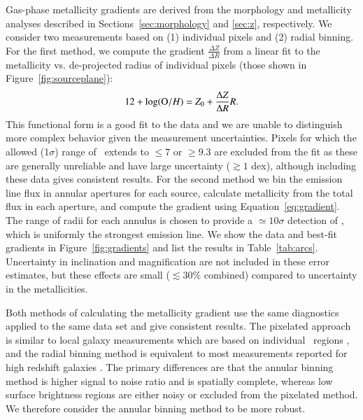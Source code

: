 Gas-phase metallicity gradients are derived from the morphology and metallicity analyses described in
Sections~\ref{sec:morphology} and \ref{sec:z}, respectively. We consider two measurements based on (1) individual
pixels and (2) radial binning. For the first method, we compute the gradient $\frac{\Delta Z}{\Delta R}$ from a
linear fit to the metallicity vs. de-projected radius of individual pixels (those shown in
Figure~\ref{fig:sourceplane}):
\begin{equation}\label{eq:gradient} 
    12+\log({\mathrm O/H}) = Z_0 + \frac{\Delta Z}{\Delta R} R.
\end{equation}
This functional form is a good fit to the data and we are unable to distinguish more complex
behavior given the measurement uncertainties. Pixels for which the allowed (1$\sigma$) range of \oh\ extends to
$\leq7$ or $\geq9.3$ are excluded from the fit as these are generally unreliable and have large uncertainty
($\gtrsim 1$ dex), although including these data gives consistent results. For the second method we bin the
emission line flux in annular apertures for each source, calculate metallicity from the total flux in each
aperture, and compute the gradient using Equation~\ref{eq:gradient}. The range of radii for each annulus is
chosen to provide a $\simeq10\sigma$ detection of \OIII, which is uniformly the strongest emission line. We show
the data and best-fit gradients in Figure~\ref{fig:gradients} and list the results in Table~\ref{tab:arcs}.
Uncertainty in inclination and magnification are not included in these error estimates, but these effects are
small ($\lesssim 30$\% combined) compared to uncertainty in the metallicities.

Both methods of calculating the metallicity gradient use the same diagnostics applied to the same data set and
give consistent results. The pixelated approach is similar to local galaxy measurements which are based on
individual \HII\ regions \citep[e.g.,][]{Vila-Costas1992}, and the radial binning method is equivalent to most
measurements reported for high redshift galaxies \citep{Yuan2011,Swinbank2012,Queyrel2012,Stott2014}. The primary
differences are that the annular binning method is higher signal to noise ratio and is spatially complete,
whereas low surface brightness regions are either noisy or excluded from the pixelated method. We therefore
consider the annular binning method to be more robust.


